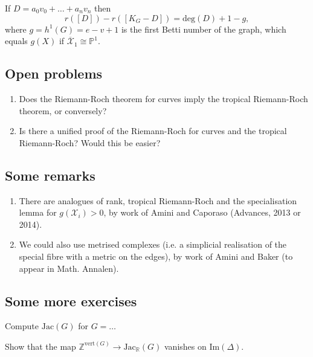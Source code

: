 \begin{theorem} If $D = a_0 v_0 + \ldots + a_n v_n$ then $$ r([D]) - r([K_G-D]) = \mathrm{deg}(D) + 1 -g,$$ where $g = h^1(G) = e-v+1$ is the first Betti number of the graph, which equals $g(X)$ if $\overline{\mathcal{X}}_1 \cong \mathbb{P}^1$.\end{theorem}

\subsection{Open problems}
\begin{enumerate}
\item Does the Riemann-Roch theorem for curves imply the tropical Riemann-Roch theorem, or conversely?
\item Is there a unified proof of the Riemann-Roch for curves and the tropical Riemann-Roch? Would this be easier?
\end{enumerate}

\subsection{Some remarks}
\begin{enumerate}
\item There are analogues of rank, tropical Riemann-Roch and the specialisation lemma for $g(\mathcal{X}_i) > 0$, by work of Amini and Caporaso (Advances, 2013 or 2014).
\item We could also use metrised complexes (i.e. a simplicial realisation of the special fibre with a metric on the edges), by work of Amini and Baker (to appear in Math. Annalen).
\end{enumerate}

\subsection{Some more exercises}
\begin{exercise} Compute $\mathrm{Jac}(G)$ for $G = \ldots$ 
\end{exercise}
\begin{exercise} Show that the map $\mathbb{Z}^{\mathrm{vert}(G)} \to \mathrm{Jac}_{\mathbb{R}}(G)$ vanishes on $\mathrm{Im}(\Delta)$. \end{exercise}
